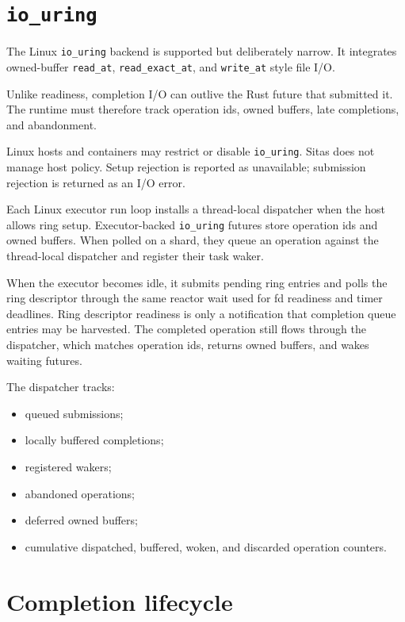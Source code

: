 \section{\texttt{io\_uring}}

The Linux \texttt{io\_uring} backend is supported but deliberately narrow. It
integrates owned-buffer \texttt{read\_at},
\texttt{read\_exact\_at}, and \texttt{write\_at} style file I/O.

Unlike readiness, completion I/O can outlive the Rust future that submitted
it. The runtime must therefore track operation ids, owned buffers, late
completions, and abandonment.

Linux hosts and containers may restrict or disable \texttt{io\_uring}. Sitas
does not manage host policy. Setup rejection is reported as unavailable;
submission rejection is returned as an I/O error.

Each Linux executor run loop installs a thread-local dispatcher when the host
allows ring setup. Executor-backed \texttt{io\_uring} futures store operation
ids and owned buffers. When polled on a shard, they queue an operation against
the thread-local dispatcher and register their task waker.

When the executor becomes idle, it submits pending ring entries and polls the
ring descriptor through the same reactor wait used for fd readiness and timer
deadlines. Ring descriptor readiness is only a notification that completion
queue entries may be harvested. The completed operation still flows through the
dispatcher, which matches operation ids, returns owned buffers, and wakes
waiting futures.

The dispatcher tracks:

\begin{itemize}
    \item queued submissions;
    \item locally buffered completions;
    \item registered wakers;
    \item abandoned operations;
    \item deferred owned buffers;
    \item cumulative dispatched, buffered, woken, and discarded operation
          counters.
\end{itemize}

\section{Completion lifecycle}

